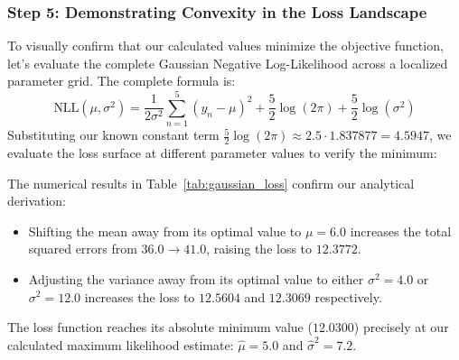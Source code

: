 \documentclass{article}
\begin{document}
\subsubsection{Step 5: Demonstrating Convexity in the Loss Landscape}
To visually confirm that our calculated values minimize the objective function, let's evaluate the complete Gaussian Negative Log-Likelihood across a localized parameter grid. The complete formula is:
\begin{equation}
\text{NLL}(\mu, \sigma^2) = \frac{1}{2\sigma^2}\sum_{n=1}^5 (y_n - \mu)^2 + \frac{5}{2}\log(2\pi) + \frac{5}{2}\log(\sigma^2)
\end{equation}
Substituting our known constant term $\frac{5}{2}\log(2\pi) \approx 2.5 \cdot 1.837877 = 4.5947$, we evaluate the loss surface at different parameter values to verify the minimum:

\begin{table}[htbp]
\centering
\small
\setlength{\tabcolsep}{6pt}
\caption{Gaussian NLL Loss Evaluation over a Parameter Grid}
\label{tab:gaussian_loss}
\end{table}

The numerical results in Table~\ref{tab:gaussian_loss} confirm our analytical derivation:
\begin{itemize}
    \item Shifting the mean away from its optimal value to $\mu = 6.0$ increases the total squared errors from $36.0 \to 41.0$, raising the loss to $12.3772$.
    \item Adjusting the variance away from its optimal value to either $\sigma^2 = 4.0$ or $\sigma^2 = 12.0$ increases the loss to $12.5604$ and $12.3069$ respectively. 
\end{itemize}
The loss function reaches its absolute minimum value ($12.0300$) precisely at our calculated maximum likelihood estimate: $\hat{\mu} = 5.0$ and $\hat{\sigma}^2 = 7.2$.
\end{document}
